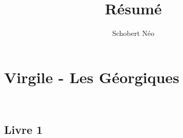 \documentclass[a4paper, 11pt, hidelinks]{article}
\begin{document}
\newcommand{\grad}[1]{\vv{grad}#1}


\title{Résumé}
\author{Schobert Néo}

\maketitle

\tableofcontents



\newpage


\section{Virgile - Les Géorgiques} 


\subsection{Livre 1}
\end{document}
